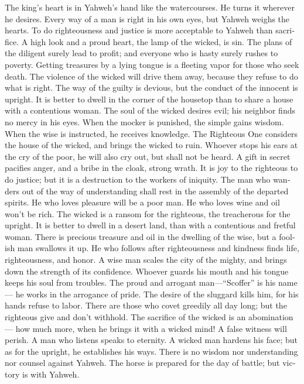 \begin{paracol}{2}
\begin{otherlanguage}{english}
 The king's heart is in Yahweh's hand like the
watercourses. He turns it wherever he desires.  Every way
of a man is right in his own eyes, but Yahweh weighs the hearts.
 To do righteousness and justice is more acceptable to
Yahweh than sacrifice.  A high look and a proud heart, the
lamp of the wicked, is sin.  The plans of the diligent
surely lead to profit; and everyone who is hasty surely rushes to
poverty.  Getting treasures by a lying tongue is a
fleeting vapor for those who seek death.  The violence of
the wicked will drive them away, because they refuse to do what is
right.  The way of the guilty is devious, but the conduct
of the innocent is upright.  It is better to dwell in the
corner of the housetop than to share a house with a contentious woman.
 The soul of the wicked desires evil; his neighbor finds
no mercy in his eyes.  When the mocker is punished, the
simple gains wisdom. When the wise is instructed, he receives knowledge.
 The Righteous One considers the house of the wicked, and
brings the wicked to ruin.  Whoever stops his ears at the
cry of the poor, he will also cry out, but shall not be heard.
 A gift in secret pacifies anger, and a bribe in the
cloak, strong wrath.  It is joy to the righteous to do
justice; but it is a destruction to the workers of iniquity.
 The man who wanders out of the way of understanding
shall rest in the assembly of the departed spirits.  He
who loves pleasure will be a poor man. He who loves wine and oil won't
be rich.  The wicked is a ransom for the righteous, the
treacherous for the upright.  It is better to dwell in a
desert land, than with a contentious and fretful woman. 
There is precious treasure and oil in the dwelling of the wise, but a
foolish man swallows it up.  He who follows after
righteousness and kindness finds life, righteousness, and honor.
 A wise man scales the city of the mighty, and brings
down the strength of its confidence.  Whoever guards his
mouth and his tongue keeps his soul from troubles.  The
proud and arrogant man---``Scoffer'' is his name--- he works in the
arrogance of pride.  The desire of the sluggard kills
him, for his hands refuse to labor.  There are those who
covet greedily all day long; but the righteous give and don't withhold.
 The sacrifice of the wicked is an abomination--- how
much more, when he brings it with a wicked mind!  A false
witness will perish. A man who listens speaks to eternity.
 A wicked man hardens his face; but as for the upright,
he establishes his ways.  There is no wisdom nor
understanding nor counsel against Yahweh.  The horse is
prepared for the day of battle; but victory is with Yahweh.


\end{otherlanguage}
\end{paracol}
